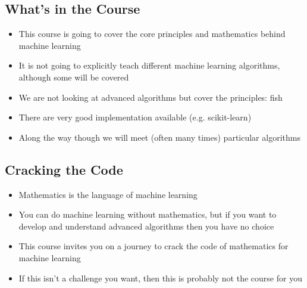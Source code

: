 
\begin{slide}
  \section[-1]{What's in the Course}

  \begin{PauseHighLight}
    \begin{itemize}
    \item This course is going to cover the core principles and
      mathematics behind machine learning\pause
    \item It is not going to explicitly teach different machine
      learning algorithms\pause, although some will be covered\pauseb
    \item We are not looking at advanced algorithms but cover the
      principles\pause: fish\pauseb
    \item There are very good implementation available (e.g.{}
      scikit-learn)\pause
    \item Along the way though we will meet (often many times)
      particular algorithms\pause
    \end{itemize}
  \end{PauseHighLight}

\end{slide}


\begin{slide}
\section{Cracking the Code}

\begin{PauseHighLight}
  \begin{itemize}
  \item Mathematics is the language of machine learning\pause
  \item You can do machine learning without mathematics, but if you want
    to develop and understand advanced algorithms then you have no
    choice\pause
  \item This course invites you on a journey to crack the code of
    mathematics for machine learning\pause
  \item If this isn't a challenge you want, then this is probably not
    the course for you\pause
  \end{itemize}
\end{PauseHighLight}

\end{slide}

